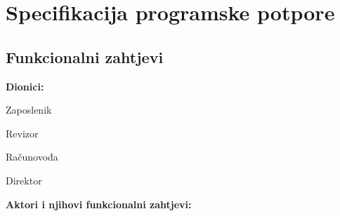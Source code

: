 \chapter{Specifikacija programske potpore}
		
	\section{Funkcionalni zahtjevi}
			
			
			\noindent \textbf{Dionici:}
			
			\begin{packed_enum}
				
				\item Zaposlenik
				\item Revizor				
				\item Računovođa
				\item Direktor
				
			\end{packed_enum}
			
			\noindent \textbf{Aktori i njihovi funkcionalni zahtjevi:}
			
